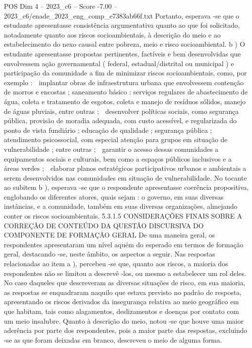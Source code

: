 \begin{textsample}{POS Dim 4 – 2023\_c6 – Score -7.00 – 2023\_c6/enade\_2023\_eng\_comp\_e7383ab66f.txt}
Portanto, esperava -se que o estudante apresentasse consistência argumentativa quanto ao que foi solicitado, notadamente quanto aos riscos socioambientais, à descrição do meio e ao estabelecimento do nexo causal entre pobreza, meio e risco socioambiental. b ) O estudante apresentasse propostas pertinentes, factíveis e bem desenvolvidas que envolvessem ação governamental ( federal, estadual/distrital ou municipal ) e participação da comunidade a fim de minimizar riscos socioambientais, como, por exemplo :  implantar obras de infraestrutura urbana que envolvessem contenção de morros e encostas ; saneamento básico : serviços regulares de abastecimento de água, coleta e tratamento de esgotos, coleta e manejo de resíduos sólidos, manejo de águas pluviais, entre outras ;  desenvolver políticas sociais, como segurança pública, provisão de moradia adequada, com custo acessível, e regularizada do ponto de vista fundiário ; educação de qualidade ; segurança pública ; atendimento psicossocial, com especial atenção para grupos em situação de vulnerabilidade ; entre outras ;  garantir o acesso dessas comunidades a equipamentos sociais e culturais, bem como a espaços públicos inclusivos e a áreas verdes ;  elaborar planos estratégicos participativos urbanos e ambientais a serem desenvolvidos nas comunidades em situação de vulnerabilidade.
No tocante ao subitem b ), esperava -se que o respondente apresentasse coerência propositiva, englobando os diferentes atores, quais sejam : o governo, em suas diversas instâncias, e a comunidade, também em suas diversas organizações, almejando conter os riscos socioambientais. 5.3.1.5 CONSIDERAÇÕES FINAIS SOBRE A CORREÇÃO DE CONTEÚDO DA QUESTÃO DISCURSIVA DO COMPONENTE DE FORMAÇÃO GERAL De uma maneira geral, os respondentes apresentaram um nível aquém do esperado em termos de formação geral, destacando -se, neste âmbito, os aspectos a seguir.
Nas respostas relacionadas ao item a ), percebeu -se que, quanto aos riscos, a maioria dos respondentes não se limitou a descrevê -los, ou mesmo a estabelecer um rol deles.
No caso daqueles que descreveram as diversas situações de risco, em sua maioria, as respostas se enquadraram naquilo que estava previsto no padrão de resposta, apresentando os riscos derivados da insegurança relativa ao meio geográfico em que habitam, tais como alagamentos, deslizamentos e doenças por contato com um meio insalubre.
Quanto à descrição do meio, notou -se que houve uma maior aderência por parte dos respondentes, pois a maior parte das respostas, excluindo -se as que foram deixadas em branco, descreveu o meio de alguma forma.

\end{textsample}
